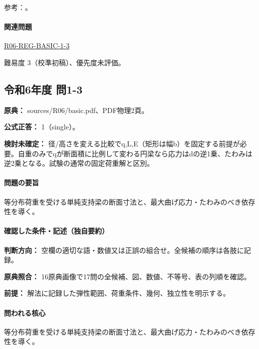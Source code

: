 \par 参考：\cite{struct_mit_beam,struct_mit_buckling,struct_mlit_limit}。

\paragraph{関連問題} \hyperref[q:r06-reg-basic-1-3]{R06-REG-BASIC-1-3}

\par 難易度 3（校準初稿）、優先度未評価。

\subsection{令和6年度 問1-3}
\label{q:r06-reg-basic-1-3}

\noindent\textbf{原典：} sources/R06/basic.pdf、PDF物理2頁。

\textbf{公式正答：} 1（single）。

\par\textbf{検討未確定：} 径/高さを変える比較でq,L,E（矩形は幅b）を固定する前提が必要。自重のみでqが断面積に比例して変わる円梁なら応力はdの逆1乗、たわみは逆2乗となる。試験の通常の固定荷重解と区別。

\paragraph{問題の要旨} 等分布荷重を受ける単純支持梁の断面寸法と、最大曲げ応力・たわみのべき依存性を導く。

\paragraph{確認した条件・記述（独自要約）}\mbox{}\par

\noindent\textbf{判断方向：} 空欄の適切な語・数値又は正誤の組合せ。全候補の順序は各肢に記録。\par

\noindent\textbf{原典照合：} 16原典画像で17問の全候補、図、数値、不等号、表の列順を確認。\par

\noindent\textbf{前提：} 解法に記録した弾性範囲、荷重条件、幾何、独立性を明示する。\par

\paragraph{問われる核心} 等分布荷重を受ける単純支持梁の断面寸法と、最大曲げ応力・たわみのべき依存性を導く。

